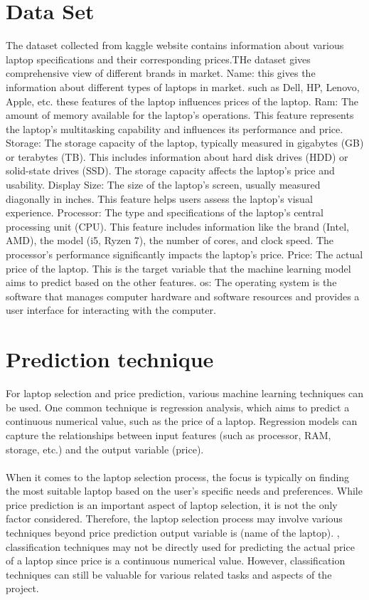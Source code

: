 \section{Data Set}
The dataset  collected from kaggle website contains information about various laptop specifications and their corresponding prices.THe dataset gives comprehensive view of different brands in market.
Name: this gives the information about different types of laptops in market. such as Dell, HP, Lenovo, Apple, etc. these features of the laptop influences prices of the laptop.
Ram: The amount of memory available for the laptop's operations. This feature represents the laptop's multitasking capability and influences its performance and price.
Storage: The storage capacity of the laptop, typically measured in gigabytes (GB) or terabytes (TB). This includes information about hard disk drives (HDD) or solid-state drives (SSD). The storage capacity affects the laptop's price and usability.
Display Size: The size of the laptop's screen, usually measured diagonally in inches. This feature helps users assess the laptop's  visual experience.
Processor: The type and specifications of the laptop's central processing unit (CPU). This feature includes information like the brand (Intel, AMD), the model (i5, Ryzen 7), the number of cores, and clock speed. The processor's performance significantly impacts the laptop's price.
Price: The actual price of the laptop. This is the target variable that the machine learning model aims to predict based on the other features.
os: The operating system is the software that manages computer hardware and software resources and provides a user interface for interacting with the computer.
\section{Prediction technique}
For laptop selection and price prediction, various machine learning techniques can be used. One common technique is regression analysis, which aims to predict a continuous numerical value, such as the price of a laptop. Regression models can capture the relationships between input features (such as processor, RAM, storage, etc.) and the output variable (price).
\paragraph{}
When it comes to the laptop selection process, the focus is typically on finding the most suitable laptop based on the user's specific needs and preferences. While price prediction is an important aspect of laptop selection, it is not the only factor considered. Therefore, the laptop selection process may involve various techniques beyond price prediction output variable is (name of the laptop).
, classification techniques may not be directly used for predicting the actual price of a laptop since price is a continuous numerical value. However, classification techniques can still be valuable for various related tasks and aspects of the project.
